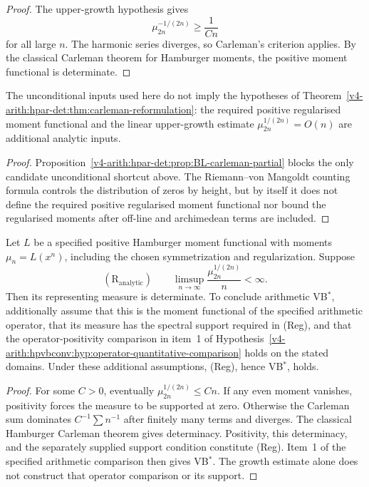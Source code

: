 \begin{proof}
The upper-growth hypothesis gives
\[
 \mu_{2n}^{-1/(2n)}\ge \frac{1}{Cn}
\]
for all large \(n\). The harmonic series diverges, so Carleman's
criterion applies. By the classical Carleman theorem for Hamburger
moments, the positive moment functional is determinate.
\end{proof}

\begin{corollary}
\label{v4-arith:hpar-det:cor:unconditional-gap}
The unconditional inputs used here do not imply the hypotheses of
Theorem~\ref{v4-arith:hpar-det:thm:carleman-reformulation}: the required positive regularised moment functional and the
linear upper-growth estimate \(\mu_{2n}^{1/(2n)}=O(n)\) are additional
analytic inputs.
\end{corollary}

\begin{proof}
Proposition~\ref{v4-arith:hpar-det:prop:BL-carleman-partial} blocks the only
candidate unconditional shortcut above. The
Riemann--von Mangoldt counting formula controls the distribution of
zeros by height, but by itself it does not define the required
positive regularised moment functional nor bound the regularised
moments after off-line and archimedean terms are included.
\end{proof}

\begin{theorem}
\label{v4-arith:hpar-det:thm:single-analytic-residual}
Let \(L\) be a specified positive Hamburger moment functional with
moments \(\mu_n=L(x^n)\), including the chosen symmetrization and
regularization. Suppose
\begin{equation}
\label{v4-arith:hpar-det:eq:single-residual}
 (\mathrm R_{\mathrm{analytic}})\qquad
 \limsup_{n\to\infty}\frac{\mu_{2n}^{1/(2n)}}n<\infty.
\end{equation}
Then its representing measure is determinate. To conclude
arithmetic VB\(^{*}\), additionally assume that this is the moment
functional of the specified arithmetic operator, that its measure
has the spectral support required in (Reg), and that the
operator-positivity comparison in item~1 of
Hypothesis~\ref{v4-arith:hpvbconv:hyp:operator-quantitative-comparison}
holds on the stated domains. Under these additional assumptions,
(Reg), hence VB\(^{*}\), holds.
\end{theorem}
\begin{proof}
For some \(C>0\), eventually \(\mu_{2n}^{1/(2n)}\le Cn\).
If any even moment vanishes, positivity forces the measure to be
supported at zero. Otherwise the Carleman sum dominates
\(C^{-1}\sum n^{-1}\) after finitely many terms and diverges.
The classical Hamburger Carleman theorem gives determinacy.
Positivity, this determinacy, and the separately supplied support
condition constitute (Reg). Item~1 of the specified arithmetic
comparison then gives VB\(^{*}\). The growth estimate alone does
not construct that operator comparison or its support.
\end{proof}

